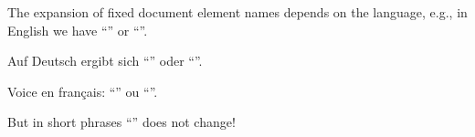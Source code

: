 \documentclass[german]{article}
\begin{document}
\raggedright
The expansion of fixed document element names
depends on the language, e.g., in English
we have ``\refname'' or ``\chaptername''.

 Auf Deutsch ergibt sich
``\refname'' oder ``\chaptername''.

\begin{otherlanguage}{french}  Voice en
fran\c cais: ``\refname'' ou ``\chaptername''.

\foreignlanguage{english}{But in short
phrases  ``\refname'' does not change!}
\end{otherlanguage}
\end{document}
